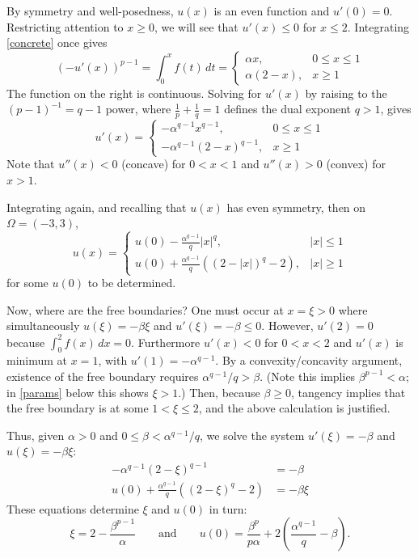 \documentclass[11pt]{amsart}
\begin{document}
By symmetry and well-posedness, $u(x)$ is an even function and $u'(0)=0$.  Restricting attention to $x\ge 0$, we will see that $u'(x)\le 0$ for $x\le 2$.  Integrating \eqref{concrete} once gives
    $$\left(-u'(x)\right)^{p-1} = \int_0^x f(t)\,dt = \begin{cases} \alpha x, & 0 \le x \le 1 \\ \alpha (2 - x), & x \ge 1\end{cases}$$
The function on the right is continuous.  Solving for $u'(x)$ by raising to the $(p-1)^{-1} = q-1$ power, where $\frac{1}{p} + \frac{1}{q} = 1$ defines the dual exponent $q>1$, gives
    $$u'(x) = \begin{cases} - \alpha^{q-1} x^{q-1}, & 0 \le x \le 1 \\ -\alpha^{q-1} (2 - x)^{q-1}, & x \ge 1\end{cases}$$
Note that $u''(x) < 0$ (concave) for $0 < x < 1$ and $u''(x)>0$ (convex) for $x>1$.

Integrating again, and recalling that $u(x)$ has even symmetry, then on $\Omega=(-3,3)$,
\begin{equation*}
u(x) = \begin{cases} u(0) - \frac{\alpha^{q-1}}{q} |x|^q, & |x| \le 1 \\
                      u(0) + \frac{\alpha^{q-1}}{q} \left( (2 - |x|)^q - 2 \right), & |x| \ge 1\end{cases}
\end{equation*}
for some $u(0)$ to be determined.

Now, where are the free boundaries?  One must occur at $x=\xi>0$ where simultaneously $u(\xi)=-\beta \xi$ and $u'(\xi)=-\beta\le 0$.  However, $u'(2)=0$ because $\int_0^2 f(x)\,dx = 0$.  Furthermore $u'(x)<0$ for $0<x<2$ and $u'(x)$ is minimum at $x=1$, with $u'(1) = -\alpha^{q-1}$.  By a convexity/concavity argument, existence of the free boundary requires $\alpha^{q-1}/q>\beta$.  (Note this implies $\beta^{p-1} < \alpha$; in \eqref{params} below this shows $\xi>1$.)  Then, because $\beta \ge 0$, tangency implies that the free boundary is at some $1 < \xi \le 2$, and the above calculation is justified.

Thus, given $\alpha>0$ and $0 \le \beta < \alpha^{q-1}/q$, we solve the system $u'(\xi)=-\beta$ and $u(\xi)=-\beta \xi$:
\begin{align*}
-\alpha^{q-1} (2 - \xi)^{q-1} &= -\beta \\
u(0) + \frac{\alpha^{q-1}}{q} \left( (2 - \xi)^q - 2 \right) &= -\beta \xi
\end{align*}
These equations determine $\xi$ and $u(0)$ in turn:
\begin{equation}
\boxed{\xi = 2 - \frac{\beta^{p-1}}{\alpha} \qquad \text{and} \qquad u(0) = \frac{\beta^p}{p \alpha} + 2 \left(\frac{\alpha^{q-1}}{q} - \beta\right).} \label{params}
\end{equation}
\end{document}

